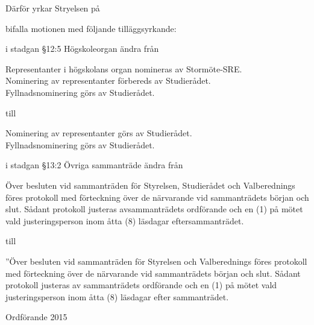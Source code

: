 \documentclass[../_main/handlingar.tex]{subfiles}
\begin{document}
Därför yrkar Stryelsen på
\begin{attsatser}
    \att bifalla motionen med följande tilläggsyrkande:

    \att i stadgan \S12:5 Högskoleorgan ändra från\par
    \begin{itshape}
      Representanter i högskolans organ nomineras av Stormöte-SRE.\\
      Nominering av representanter förbereds av Studierådet.\\
      Fyllnadsnominering görs av Studierådet.
    \end{itshape}\par
    till\par
    \begin{itshape}
      Nominering av representanter görs av Studierådet.\\
      Fyllnadsnominering görs av Studierådet.
    \end{itshape}

    \att i stadgan \S13:2 Övriga sammanträde ändra från\par
    \begin{itshape}
      Över besluten vid sammanträden för Styrelsen, Studierådet och Valberednings föres protokoll med förteckning över de närvarande vid sammanträdets början och slut. Sådant protokoll justeras avsammanträdets ordförande och en (1) på mötet vald justeringsperson inom åtta (8) läsdagar eftersammanträdet.
    \end{itshape}\par
    till\par
    \begin{itshape}
      ”Över besluten vid sammanträden för Styrelsen och Valberednings föres protokoll med förteckning över de närvarande vid sammanträdets början och slut. Sådant protokoll justeras av sammanträdets ordförande och en (1) på mötet vald justeringsperson inom åtta (8) läsdagar efter sammanträdet.
    \end{itshape}
\end{attsatser}

\begin{signatures}{1}
    \ist
    \signature{Hanna Nevalainen}{Ordförande 2015}
\end{signatures}
\end{document}
